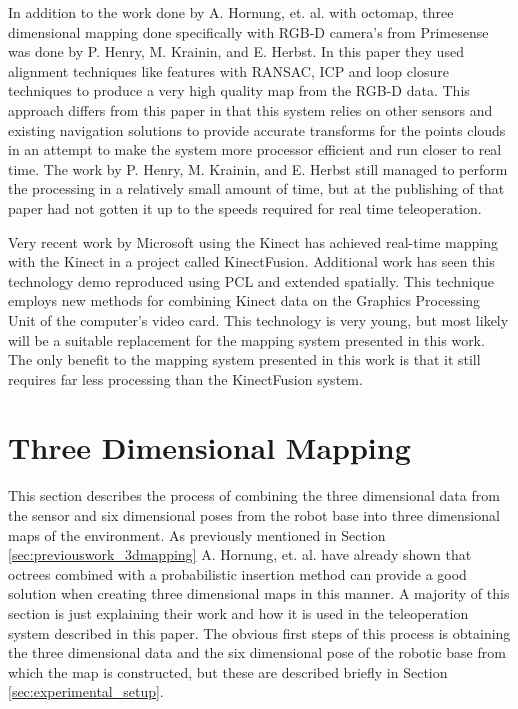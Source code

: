 \documentclass[12pt]{report}
\begin{document}
In addition to the work done by A. Hornung, et. al. with octomap, three dimensional mapping done specifically with RGB-D camera's from Primesense was done by P. Henry, M. Krainin, and E. Herbst.\cite{Henry2010}  In this paper they used alignment techniques like features with RANSAC, ICP and loop closure techniques to produce a very high quality map from the RGB-D data.\cite{Henry2010}  This approach differs from this paper in that this system relies on other sensors and existing navigation solutions to provide accurate transforms for the points clouds in an attempt to make the system more processor efficient and run closer to real time.  The work by P. Henry, M. Krainin, and E. Herbst still managed to perform the processing in a relatively small amount of time, but at the publishing of that paper had not gotten it up to the speeds required for real time teleoperation.

Very recent work by Microsoft using the Kinect has achieved real-time mapping with the Kinect in a project called KinectFusion\cite{izadi2011kinectfusion}.  Additional work has seen this technology demo reproduced using PCL and extended spatially\cite{whelankintinuous}.  This technique employs new methods for combining Kinect data on the Graphics Processing Unit of the computer's video card.  This technology is very young, but most likely will be a suitable replacement for the mapping system presented in this work.  The only benefit to the mapping system presented in this work is that it still requires far less processing than the KinectFusion system.

\section{Three Dimensional Mapping}
\label{sec:3dmapping}
This section describes the process of combining the three dimensional data from the sensor and six dimensional poses from the robot base into three dimensional maps of the environment. As previously mentioned in Section \ref{sec:previouswork_3dmapping} A. Hornung, et. al. have already shown that octrees combined with a probabilistic insertion method can provide a good solution when creating three dimensional maps in this manner. A majority of this section is just explaining their work and how it is used in the teleoperation system described in this paper.\cite{octomap} The obvious first steps of this process is obtaining the three dimensional data and the six dimensional pose of the robotic base from which the map is constructed, but these are described briefly in Section \ref{sec:experimental_setup}.
\end{document}
